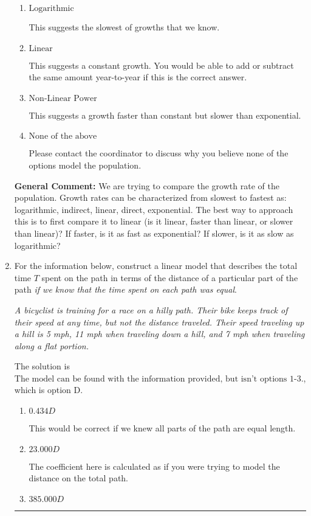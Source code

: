 \documentclass{extbook}[14pt]
\newcommand{\litem}[1]{\item #1

\rule{\textwidth}{0.4pt}}
\begin{document}
\begin{enumerate}
{\begin{enumerate}[label=\Alph*.]
This suggests the fastest of growths that we know.
\item \( \text{Logarithmic} \)

This suggests the slowest of growths that we know.
\item \( \text{Linear} \)

This suggests a constant growth. You would be able to add or subtract the same amount year-to-year if this is the correct answer.
\item \( \text{Non-Linear Power} \)

This suggests a growth faster than constant but slower than exponential.
\item \( \text{None of the above} \)

Please contact the coordinator to discuss why you believe none of the options model the population.
\end{enumerate}

\textbf{General Comment:} We are trying to compare the growth rate of the population. Growth rates can be characterized from slowest to fastest as: logarithmic, indirect, linear, direct, exponential. The best way to approach this is to first compare it to linear (is it linear, faster than linear, or slower than linear)? If faster, is it as fast as exponential? If slower, is it as slow as logarithmic?
}
\litem{
For the information below, construct a linear model that describes the total time $T$ spent on the path in terms of the distance of a particular part of the path \textit{if we know that the time spent on each path was equal}.

\begin{center}
    \textit{ A bicyclist is training for a race on a hilly path. Their bike keeps track of their speed at any time, but not the distance traveled. Their speed traveling up a hill is 5 mph, 11 mph when traveling down a hill, and 7 mph when traveling along a flat portion. }
\end{center}
The solution is \( \text{The model can be found with the information provided, but isn't options 1-3.} \), which is option D.\begin{enumerate}[label=\Alph*.]
\item \( 0.434 D \)

This would be correct if we knew all parts of the path are equal length.
\item \( 23.000 D \)

The coefficient here is calculated as if you were trying to model the distance on the total path.
\item \( 385.000 D \)


\end{enumerate}}
\end{enumerate}
\end{document}
